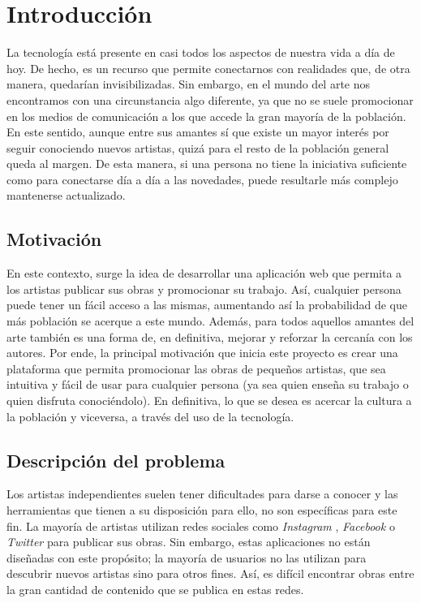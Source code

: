 \chapter{Introducción}

La tecnología está presente en casi todos los aspectos de nuestra vida a día de hoy. De hecho,
es un recurso que permite conectarnos con realidades que, de otra manera, quedarían
invisibilizadas. Sin embargo, en el mundo del arte nos encontramos con una circunstancia algo
diferente, ya que no se suele promocionar en los medios de comunicación a los que accede la
gran mayoría de la población. En este sentido, aunque entre sus amantes sí que existe un
mayor interés por seguir conociendo nuevos artistas, quizá para el resto de la población
general queda al margen. De esta manera, si una persona no tiene la iniciativa suficiente
como para conectarse día a día a las novedades, puede resultarle más complejo mantenerse
actualizado. 
 
\section{Motivación}  
 
En este contexto, surge la idea de desarrollar una aplicación web que permita a los artistas
publicar sus obras y promocionar su trabajo. Así, cualquier persona puede tener un fácil
acceso a las mismas, aumentando así la probabilidad de que más población se acerque a este
mundo. Además, para todos aquellos amantes del arte también es una forma de, en definitiva,
mejorar y reforzar la cercanía con los autores. Por ende, la principal motivación que inicia
este proyecto es crear una plataforma que permita promocionar las obras de pequeños artistas,
que sea intuitiva y fácil de usar para cualquier persona (ya sea quien enseña su trabajo o
quien disfruta conociéndolo). En definitiva, lo que se desea es acercar la cultura a la
población y viceversa, a través del uso de la tecnología.  
 
\section{Descripción del problema} 
 
Los artistas independientes suelen tener dificultades para darse a conocer y las herramientas
que tienen a su disposición para ello, no son específicas para este fin. La mayoría de
artistas utilizan redes sociales como \textit{Instagram} \cite{instagram}, \textit{Facebook}
\cite{facebook} o \textit{Twitter} \cite{twitter} para publicar sus obras. Sin embargo, estas
aplicaciones no están diseñadas con este propósito; la mayoría de usuarios no las utilizan
para descubrir nuevos artistas sino para otros fines. Así, es difícil encontrar obras entre
la gran cantidad de contenido que se publica en estas redes.  
 

